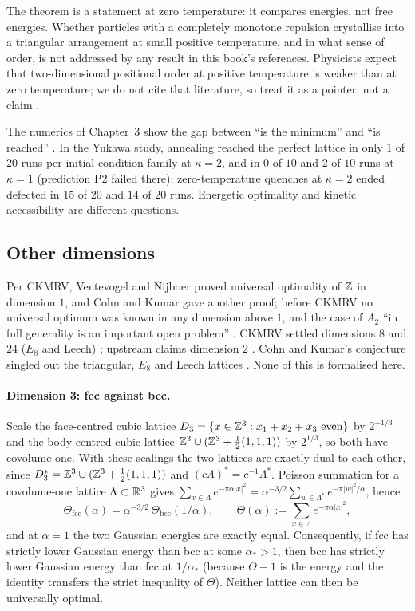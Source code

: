 The theorem is a statement at zero temperature: it compares energies, not free energies. Whether particles with a
completely monotone repulsion crystallise into a triangular arrangement at small positive temperature, and in what
sense of order, is not addressed by any result in this book's references. Physicists expect that two-dimensional
positional order at positive temperature is weaker than at zero temperature; we do not cite that literature, so
treat it as a pointer, not a claim \tierC{}.

The numerics of Chapter~3 show the gap between ``is the minimum'' and ``is reached'' \tierX{}. In the Yukawa study,
annealing reached the perfect lattice in only $1$ of $20$ runs per initial-condition family at $\kappa=2$, and in $0$
of $10$ and $2$ of $10$ runs at $\kappa=1$ (prediction P2 failed there); zero-temperature quenches at $\kappa=2$ ended
defected in $15$ of $20$ and $14$ of $20$ runs. Energetic optimality and kinetic accessibility are different
questions.

\subsection{Other dimensions}

\tierL{} Per CKMRV, Ventevogel and Nijboer proved universal optimality of $\mathbb{Z}$ in dimension $1$, and Cohn and Kumar
gave another proof; before CKMRV no universal optimum was known in any dimension above $1$, and the case of $A_2$
``in full generality is an important open problem'' \cite[\S1.2]{ckmrv}. CKMRV settled dimensions $8$ and $24$
($E_8$ and Leech) \cite{ckmrv}; upstream claims dimension $2$ \cite{oai}. Cohn and Kumar's conjecture singled out the
triangular, $E_8$ and Leech lattices \cite{ck,oai}. None of this is formalised here.

\paragraph{Dimension 3: fcc against bcc.}
\tierC{} Scale the face-centred cubic lattice $D_3=\{x\in\mathbb{Z}^3:x_1+x_2+x_3\text{ even}\}$ by $2^{-1/3}$ and the
body-centred cubic lattice $\mathbb{Z}^3\cup(\mathbb{Z}^3+\tfrac12(1,1,1))$ by $2^{1/3}$, so both have covolume one. With these scalings the two
lattices are exactly dual to each other, since $D_3^*=\mathbb{Z}^3\cup(\mathbb{Z}^3+\tfrac12(1,1,1))$ and $(c\Lambda)^*=c^{-1}\Lambda^*$. Poisson summation for a
covolume-one lattice $\Lambda\subset\mathbb{R}^3$ gives $\sum_{x\in\Lambda}e^{-\pi\alpha|x|^2}=\alpha^{-3/2}
\sum_{w\in\Lambda^*}e^{-\pi|w|^2/\alpha}$, hence
\[
\Theta_{\mathrm{fcc}}(\alpha)=\alpha^{-3/2}\,\Theta_{\mathrm{bcc}}(1/\alpha),\qquad
\Theta(\alpha):=\sum_{x\in\Lambda}e^{-\pi\alpha|x|^2},
\]
and at $\alpha=1$ the two Gaussian energies are exactly equal. Consequently, if fcc has strictly lower Gaussian energy
than bcc at some $\alpha_*>1$, then bcc has strictly lower Gaussian energy than fcc at $1/\alpha_*$ (because
$\Theta-1$ is the energy and the identity transfers the strict inequality of $\Theta$). Neither lattice can then be
universally optimal.

